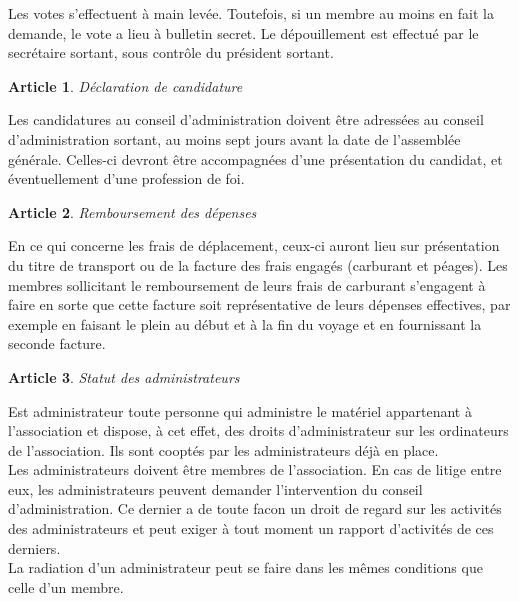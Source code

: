 \documentclass[a4paper,twoside]{article}
\theoremstyle{plain}
\newtheorem{Art}{Article}
\begin{document}
Les votes s'effectuent à main levée. Toutefois, si un membre au moins en fait la
demande, le vote a lieu à  bulletin secret. Le dépouillement est effectué par le
secrétaire sortant, sous contrôle du président sortant.

\begin{Art}Déclaration de candidature\end{Art}

Les candidatures  au conseil d'administration doivent être  adressées au conseil
d'administration  sortant, au  moins sept  jours  avant la  date de  l'assemblée
générale. Celles-ci devront être accompagnées d'une présentation du candidat, et
éventuellement d'une profession de foi.

\begin{Art}Remboursement des dépenses\end{Art}

En  ce  qui  concerne  les   frais  de  déplacement,  ceux-ci  auront  lieu  sur
présentation du titre de transport ou de la facture des frais engagés (carburant
et péages). Les membres sollicitant le remboursement de leurs frais de carburant
s'engagent  à faire  en sorte  que cette  facture soit  représentative  de leurs
dépenses effectives,  par exemple en faisant  le plein au  début et à la  fin du
voyage et en fournissant la seconde facture.

\begin{Art}Statut des administrateurs\end{Art}

Est  administrateur toute  personne  qui administre  le  matériel appartenant  à
l'association  et dispose,  à cet  effet,  des droits  d'administrateur sur  les
ordinateurs de l'association.  Ils sont cooptés par les  administrateurs déjà en
place.\\

Les  administrateurs doivent  être membres  de l'association.  En cas  de litige
entre  eux,  les  administrateurs  peuvent demander  l'intervention  du  conseil
d'administration.  Ce dernier  a  de toute  facon  un droit  de  regard sur  les
activités  des  administrateurs  et  peut   exiger  à  tout  moment  un  rapport
d'activités de ces derniers.\\

La radiation  d'un administrateur  peut se faire  dans les mêmes  conditions que
celle d'un membre.
\end{document}
